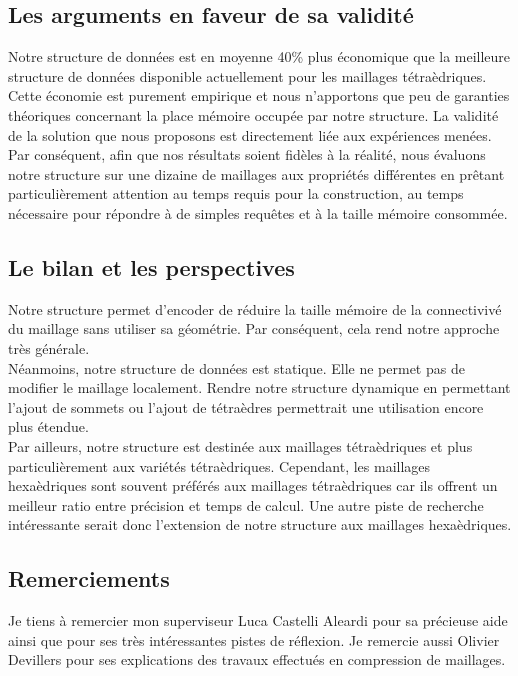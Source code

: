 \subsection*{Les arguments en faveur de sa validité}
\noindent
Notre structure de données est en moyenne 40\% plus économique que la meilleure structure de données disponible actuellement pour les maillages tétraèdriques. Cette économie est purement empirique et nous n'apportons que peu de garanties théoriques concernant la place mémoire occupée par notre structure. La validité de la solution que nous proposons est directement liée aux expériences menées. Par conséquent, afin que nos résultats soient fidèles à la réalité, nous évaluons notre structure sur une dizaine de maillages aux propriétés différentes en prêtant particulièrement attention au temps requis pour la construction, au temps nécessaire pour répondre à de simples requêtes et à la taille mémoire consommée.

\subsection*{Le bilan et les perspectives}
\noindent
Notre structure permet d'encoder de réduire la taille mémoire de la connectivivé du maillage sans utiliser sa géométrie. Par conséquent, cela rend notre approche très générale.\\
Néanmoins, notre structure de données est statique. Elle ne permet pas de modifier le maillage localement. Rendre notre structure dynamique en permettant l'ajout de sommets ou l'ajout de tétraèdres permettrait une utilisation encore plus étendue.\\
Par ailleurs, notre structure est destinée aux maillages tétraèdriques et plus particulièrement aux variétés tétraèdriques. Cependant, les maillages hexaèdriques sont souvent préférés aux maillages tétraèdriques car ils offrent un meilleur ratio entre précision et temps de calcul. Une autre piste de recherche intéressante serait donc l'extension de notre structure aux maillages hexaèdriques.

\subsection*{Remerciements}
\noindent
Je tiens à remercier mon superviseur Luca Castelli Aleardi pour sa précieuse aide ainsi que pour ses très intéressantes pistes de réflexion. Je remercie aussi Olivier Devillers pour ses explications des travaux effectués en compression de maillages.

